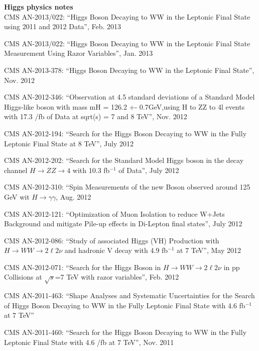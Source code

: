         {\bf Higgs physics notes}
        \\    

CMS AN-2013/022: ``Higgs Boson Decaying to WW in the Leptonic Final State using 2011 and 2012 Data'', Feb. 2013

CMS AN-2013/022: ``Higgs Boson Decaying to WW in the Leptonic Final State Measurement Using Razor Variables'', Jan. 2013

CMS AN-2013-378: ``Higgs Boson Decaying to WW in the Leptonic Final State'', Nov. 2012

CMS AN-2012-346: ``Observation at 4.5 standard deviations of a Standard Model Higgs-like boson with mass mH = 126.2 +- 0.7GeV,using H to ZZ to 4l events with 17.3 /fb of Data at sqrt(s) = 7 and 8 TeV'', Nov. 2012

CMS AN-2012-194: ``Search for the Higgs Boson Decaying to WW in the Fully Leptonic Final State at 8 TeV'', July 2012

CMS AN-2012-202: ``Search for the Standard Model Higgs boson in the decay channel $H\to ZZ\to 4$ with 10.3 fb$^{-1}$ of Data'', July 2012

CMS AN-2012-310: ``Spin Measurements of the new Boson observed around 125 GeV wit $H\to\gamma\gamma$, Aug. 2012

CMS AN-2012-121: ``Optimization of Muon Isolation to reduce W+Jets Background and mitigate Pile-up effects in Di-Lepton final states'', July 2012

CMS AN-2012-086: ``Study of associated Higgs (VH) Production with $H\to WW\to 2\ell 2\nu$ and hadronic V decay with 4.9 fb$^{-1}$ at 7 TeV'', May 2012

CMS AN-2012-071: ``Search for the Higgs Boson in $H\to WW\to 2\ell 2\nu$ in pp Collisions at $\sqrt{s}$=7 TeV with razor variables'', Feb. 2012

CMS AN-2011-463: ``Shape Analyses and Systematic Uncertainties for the Search of Higgs Boson Decaying to WW in the Fully Leptonic Final State with 4.6 fb$^{-1}$ at 7 TeV''

CMS AN-2011-460: ``Search for the Higgs Boson Decaying to WW in the Fully Leptonic Final State with 4.6 /fb at 7 TeV'', Nov. 2011

